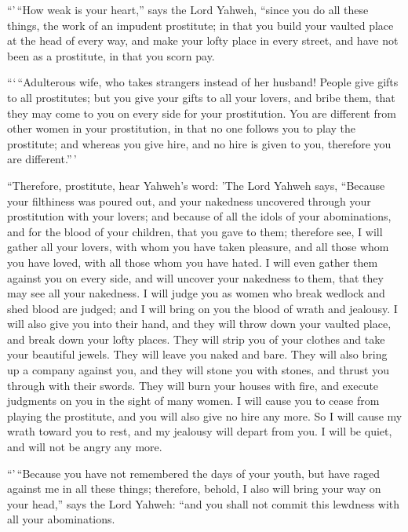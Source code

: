 ``'\,``How weak is your heart,'' says the Lord Yahweh,
``since you do all these things, the work of an impudent prostitute;
 in that you build your vaulted place at the head of
every way, and make your lofty place in every street, and have not been
as a prostitute, in that you scorn pay.

 ```\,``Adulterous wife, who takes strangers instead of
her husband!  People give gifts to all prostitutes; but
you give your gifts to all your lovers, and bribe them, that they may
come to you on every side for your prostitution.  You are
different from other women in your prostitution, in that no one follows
you to play the prostitute; and whereas you give hire, and no hire is
given to you, therefore you are different.''\,'

 ``Therefore, prostitute, hear Yahweh's word:
 'The Lord Yahweh says, ``Because your filthiness was
poured out, and your nakedness uncovered through your prostitution with
your lovers; and because of all the idols of your abominations, and for
the blood of your children, that you gave to them; 
therefore see, I will gather all your lovers, with whom you have taken
pleasure, and all those whom you have loved, with all those whom you
have hated. I will even gather them against you on every side, and will
uncover your nakedness to them, that they may see all your nakedness.
 I will judge you as women who break wedlock and shed
blood are judged; and I will bring on you the blood of wrath and
jealousy.  I will also give you into their hand, and they
will throw down your vaulted place, and break down your lofty places.
They will strip you of your clothes and take your beautiful jewels. They
will leave you naked and bare.  They will also bring up a
company against you, and they will stone you with stones, and thrust you
through with their swords.  They will burn your houses
with fire, and execute judgments on you in the sight of many women. I
will cause you to cease from playing the prostitute, and you will also
give no hire any more.  So I will cause my wrath toward
you to rest, and my jealousy will depart from you. I will be quiet, and
will not be angry any more.

 ``'\,``Because you have not remembered the days of your
youth, but have raged against me in all these things; therefore, behold,
I also will bring your way on your head,'' says the Lord Yahweh: ``and
you shall not commit this lewdness with all your abominations.

